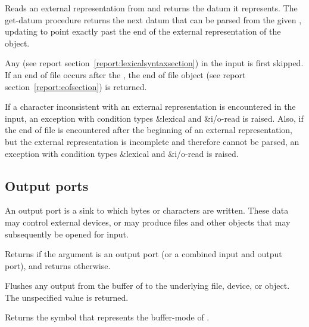 \begin{entry}{%
}
 
Reads an external representation from  and returns the
datum it represents.  The {\cf get-datum} procedure returns the next
datum that can be parsed from the given , updating
 to point exactly past the end of the external
representation of the object.

Any 
(see report section~\ref{report:lexicalsyntaxsection}) in
the input is first skipped.  If an end of file occurs after the
, the end of file object (see
report section~\ref{report:eofsection}) is returned.

If a character inconsistent with an external representation is
encountered in the input, an exception with condition types
{\cf\&lexical} and {\cf\&i/o-read} is raised.
Also, if the end of file is encountered
after the beginning of an external representation, but the external
representation is incomplete and therefore cannot be parsed, an exception
with condition types {\cf\&lexical} and {\cf\&i/o-read} is raised.
\end{entry}

\subsection{Output ports}

An output port is a sink to which bytes or characters are written.
These data may control
external devices, or may produce files and other objects that may
subsequently be opened for input.

\begin{entry}{%
}
   
Returns \schtrue{} if the argument is an output port (or a
combined input and output port), and returns \schfalse{} otherwise.
\end{entry}   

\begin{entry}{%
}
   
Flushes any output from the buffer of  to the
underlying file, device, or object. The unspecified value is returned.
\end{entry}

\begin{entry}{%
}
   
Returns the symbol that represents the buffer-mode of
.
\end{entry}

